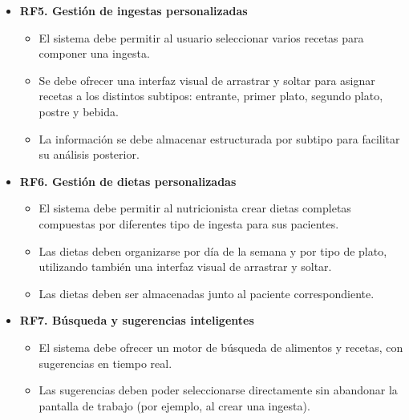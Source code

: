 \begin{itemize}
    \item \textbf{RF5. Gestión de ingestas personalizadas}
    \begin{itemize}
        \item El sistema debe permitir al usuario seleccionar varios recetas para componer una ingesta.
        \item Se debe ofrecer una interfaz visual de arrastrar y soltar para asignar recetas a los distintos subtipos: entrante, primer plato, segundo plato, postre y bebida.
        \item La información se debe almacenar estructurada por subtipo para facilitar su análisis posterior.
    \end{itemize}

    \item \textbf{RF6. Gestión de dietas personalizadas}
    \begin{itemize}
        \item El sistema debe permitir al nutricionista crear dietas completas compuestas por diferentes tipo de ingesta para sus pacientes.
        \item Las dietas deben organizarse por día de la semana y por tipo de plato, utilizando también una interfaz visual de arrastrar y soltar.
        \item Las dietas deben ser almacenadas junto al paciente correspondiente.
    \end{itemize}

    \item \textbf{RF7. Búsqueda y sugerencias inteligentes}
    \begin{itemize}
        \item El sistema debe ofrecer un motor de búsqueda de alimentos y recetas, con sugerencias en tiempo real.
        \item Las sugerencias deben poder seleccionarse directamente sin abandonar la pantalla de trabajo (por ejemplo, al crear una ingesta).
  \end{itemize}
\end{itemize}

